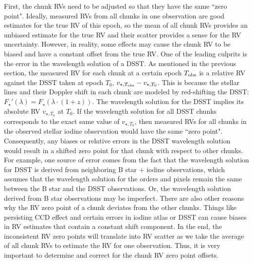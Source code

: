 First, the chunk RVs need to be adjusted so that they have the same
``zero point". Ideally, measured RVs from all chunks in one
observation are good estimates for the true RV of this epoch, so the
mean of all chunk RVs provides an unbiased estimate for the true RV
and their scatter provides a sense for the RV uncertainty. However, in
reality, some effects may cause the chunk RV to be biased and have a
constant offset from the true RV. One of the leading culprits is the
error in the wavelength solution of a DSST. As mentioned in the
previous section, the measured RV for each chunk at a certain epoch
$T_{\rm obs}$ is a relative RV against the DSST taken at epoch $T_0$,
$v_{\star, T_{\rm obs}} - v_{\star, T_0}$. This is because the stellar lines
and their Doppler shift in each chunk are modeled by red-shifting the
DSST: $F_{\star}'(\lambda) = F_{\star}(\lambda\cdot(1+z))$. The wavelength
solution for the DSST implies its absolute RV $v_{\star, T_0}$ at
$T_0$. If the wavelength solution for all DSST chunks corresponds to
the exact same value of $v_{\star, T_0}$, then measured RVs for all
chunks in the observed stellar iodine observation would have the same
``zero point". Consequently, any biases or relative errors in the DSST
wavelength solution would result in a shifted zero point for that
chunk with respect to other chunks. For example, one source of error
comes from the fact that the wavelength solution for DSST is derived
from neighboring B star $+$ iodine observations, which assumes that
the wavelength solution for the orders and pixels remain the same
between the B star and the DSST observations. Or, the wavelength
solution derived from B star observations may be imperfect. There are
also other reasons why the RV zero point of a chunk deviates from the
other chunks. Things like persisting CCD effect and certain errors in
iodine atlas or DSST can cause biases in RV estimates that contain a
constant shift component. In the end, the inconsistent RV zero points
will translate into RV scatter as we take the average of all chunk RVs
to estimate the RV for one observation. Thus, it is very important to
determine and correct for the chunk RV zero point offsets.

